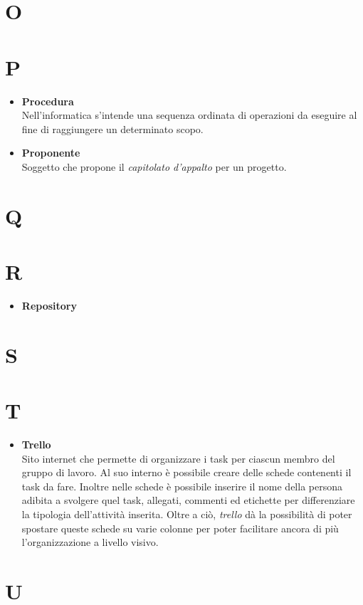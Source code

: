 \chapter{O}
\chapter{P}
	\begin{itemize}
		\item \textbf{Procedura}\\
		Nell'informatica s'intende una sequenza ordinata di operazioni da eseguire al fine di raggiungere un determinato scopo.

		\item \textbf{Proponente}\\
		Soggetto che propone il \textit{capitolato d'appalto} per un progetto.
	\end{itemize}
\chapter{Q}
\chapter{R}
	\begin{itemize}
		\item \textbf{Repository}
	\end{itemize}
\chapter{S}
\chapter{T}
	\begin{itemize}
		\item \textbf{Trello}\\
		Sito internet che permette di organizzare i task per ciascun membro del gruppo di lavoro.
		Al suo interno è possibile creare delle schede contenenti il task da fare.
		Inoltre nelle schede è possibile inserire il nome della persona adibita a svolgere quel task, allegati, commenti ed etichette per differenziare la tipologia dell'attività inserita.
		Oltre a ciò, \textit{trello} dà la possibilità di poter spostare queste schede su varie colonne per poter facilitare ancora di più l'organizzazione a livello visivo.
	\end{itemize}
\chapter{U}
